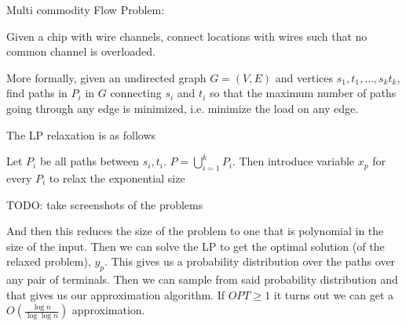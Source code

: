 \documentclass[../notes.tex]{subfiles}
\begin{document}
\begin{example}
    Multi commodity Flow Problem:

    Given a chip with wire channels, connect locations with wires such that no common channel is overloaded.

    More formally, given an undirected graph $ G = (V, E) $ and vertices $ s_1, t_1, \ldots, s_k t_k$, find paths in $ P_i $ in $ G $ connecting $ s_i $ and $ t_i $ so that the maximum number of paths going through any edge is minimized, i.e. minimize the load on any edge.
\end{example}

The LP relaxation is as follows

Let $ P_i $ be all paths between $ s_i, t_i $. $ P = \bigcup^k_{i=1} P_i $.
Then introduce variable $ x_p $ for every $ P_i $ to relax the exponential size

TODO: take screenshots of the problems

And then this reduces the size of the problem to one that is polynomial in the size of the input. 
Then we can solve the LP to get the optimal solution (of the relaxed problem), $ y_p $.
This gives us a probability distribution over the paths over any pair of terminals. Then we can sample from said probability distribution and that gives us our approximation algorithm.
If $ OPT \ge 1 $ it turns out we can get a $ O(\frac{\log n}{ \log \log n }) $ approximation.
\end{document}
